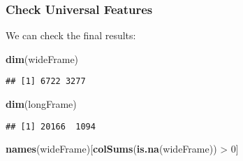 \documentclass[10pt]{report}
\newenvironment{Shaded}{}{}
\newcommand{\KeywordTok}[1]{\textcolor[rgb]{0.00,0.44,0.13}{\textbf{{#1}}}}
\newcommand{\DecValTok}[1]{\textcolor[rgb]{0.25,0.63,0.44}{{#1}}}
\newcommand{\StringTok}[1]{\textcolor[rgb]{0.25,0.44,0.63}{{#1}}}
\newcommand{\NormalTok}[1]{{#1}}
\begin{document}
\begin{Shaded}
\end{Shaded}

\subsubsection{Check Universal
Features}\label{check-universal-features-3}

We can check the final results:

\begin{Shaded}
\begin{Highlighting}[]
\KeywordTok{dim}\NormalTok{(wideFrame)}
\end{Highlighting}
\end{Shaded}

\begin{verbatim}
## [1] 6722 3277
\end{verbatim}

\begin{Shaded}
\begin{Highlighting}[]
\KeywordTok{dim}\NormalTok{(longFrame)}
\end{Highlighting}
\end{Shaded}

\begin{verbatim}
## [1] 20166  1094
\end{verbatim}

\begin{Shaded}
\begin{Highlighting}[]
\KeywordTok{names}\NormalTok{(wideFrame)[}\KeywordTok{colSums}\NormalTok{(}\KeywordTok{is.na}\NormalTok{(wideFrame)) >}\StringTok{ }\DecValTok{0}\NormalTok{]}
\end{Highlighting}
\end{Shaded}
\end{document}

